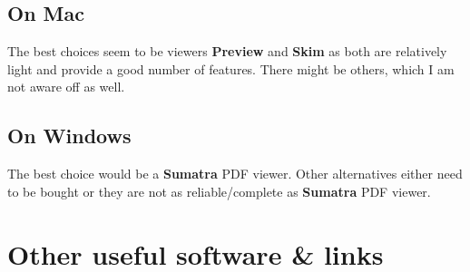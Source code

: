 \documentclass[a4paper]{article}
\begin{document}
\subsection{On Mac}

The best choices seem to be viewers \textbf{Preview} and \textbf{Skim} as both
are relatively light and provide a good number of features. There might be
others, which I am not aware off as well.

\subsection{On Windows}

The best choice would be a \textbf{Sumatra} PDF viewer. Other alternatives
either need to be bought or they are not as reliable/complete as
\textbf{Sumatra} PDF viewer.

\section{Other useful software \& links}
\end{document}
